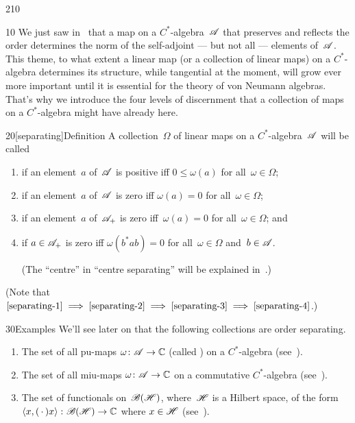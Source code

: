 \begin{parsec}{210}%
\begin{point}{10}%
We just saw in~ that a
map on a $C^*$-algebra~$\mathscr{A}$
that preserves and reflects the order
determines the norm of the self-adjoint
--- but not all --- elements of~$\mathscr{A}$.
This theme, to what extent a linear map
(or a collection of linear maps)
on a $C^*$-algebra
determines its structure,
while tangential at the moment,
will
grow ever more important 
until it is essential for the theory 
of von Neumann algebras.
That's why we introduce
the four levels
of discernment
that a collection of maps on a $C^*$-algebra
might have already here.
\end{point}
\begin{point}{20}[separating]{Definition}%
A collection~$\Omega$ of linear maps on a $C^*$-algebra~$\mathscr{A}$
will be called
\begin{enumerate}
\item
\label{separating-1}
%
if an element~$a$ of~$\mathscr{A}$
is positive iff $0\leq \omega(a)$
for all~$\omega\in \Omega$;
\item
    \label{separating-2}
%
if an element~$a$ of~$\mathscr{A}$
is zero iff $\omega(a)=0$ for all~$\omega\in\Omega$;
\item
    \label{separating-3}
 if an element~$a$ of~$\mathscr{A}_+$%
is zero iff~$\omega(a)=0$ for all~$\omega\in\Omega$; and
\item
    \label{separating-4}
%
if $a\in\mathscr{A}_+$
is zero iff $\omega(b^*ab)=0$ for all~$\omega\in\Omega$
and~$b\in \mathscr{A}$.

(The ``centre'' in ``centre separating''
will be explained in~.)
\end{enumerate}
(Note that 
    $\text{\eqref{separating-1}}
\implies
    \text{\eqref{separating-2}}
\implies
    \text{\eqref{separating-3}}
\implies
    \eqref{separating-4}$.)
\end{point}
\begin{point}{30}{Examples}%
We'll see later on that the following
collections
are order separating.
\begin{enumerate}
\item
The set of all pu-maps $\omega\colon \mathscr{A}\to\mathbb{C}$
    (called )
on a $C^*$-algebra
(see~).
\item
The set of all miu-maps $\omega\colon \mathscr{A}\to\mathbb{C}$
on a commutative $C^*$-algebra
(see~).
\item
The set of functionals on~$\mathscr{B}(\mathscr{H})$,
where~$\mathscr{H}$ is a Hilbert space,
of the form 
$\left<x,(\,\cdot\,)x\right>
\colon \mathscr{B}(\mathscr{H})\to\mathbb{C}$ where $x\in \mathscr{H}$
(see~).


\end{enumerate}
\end{point}
\end{parsec}
